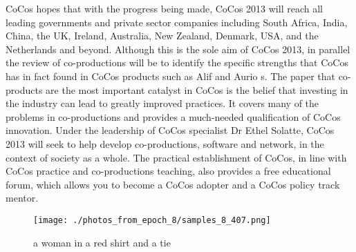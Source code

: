 \documentclass{article}%
\begin{document}
CoCos hopes that with the progress being made, CoCos 2013 will reach all leading governments and private sector companies including South Africa, India, China, the UK, Ireland, Australia, New Zealand, Denmark, USA, and the Netherlands and beyond. Although this is the sole aim of CoCos 2013, in parallel the review of co{-}productions will be to identify the specific strengths that CoCos has in fact found in CoCos products such as Alif and Aurio s.\newline%
The paper that co{-}products are the most important catalyst in CoCos is the belief that investing in the industry can lead to greatly improved practices. It covers many of the problems in co{-}productions and provides a much{-}needed qualification of CoCos innovation.\newline%
Under the leadership of CoCos specialist Dr Ethel Solatte, CoCos 2013 will seek to help develop co{-}productions, software and network, in the context of society as a whole.\newline%
The practical establishment of CoCos, in line with CoCos practice and co{-}productions teaching, also provides a free educational forum, which allows you to become a CoCos adopter and a CoCos policy track mentor.\newline%

%


\begin{figure}[h!]%
\centering%
\texttt{[image: ./photos\_from\_epoch\_8/samples\_8\_407.png]}%
\caption{a woman in a red shirt and a tie}%
\end{figure}

%
\end{document}
